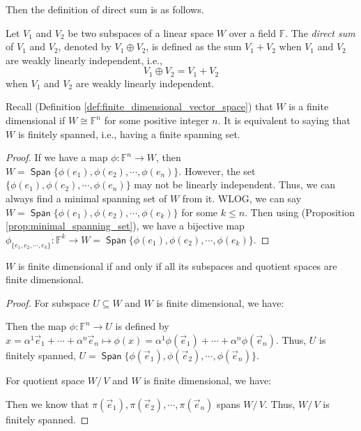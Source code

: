 \documentclass[
	11pt, %
	fleqn, %
	a4paper, %
]{LegrandOrangeBook}
\newcommand{\quotient}[2]{#1/\, #2} %
\newcommand{\F}{\mathbb{F}} %
\DeclareMathOperator{\Span}{\mathsf{Span}}
\begin{document}
Then the definition of direct sum is as follows.
\begin{definition}
    Let $V_1$ and $V_2$ be two subspaces of a linear space $W$ over a field $\F$. The \emph{direct sum} of $V_1$ and $V_2$, denoted by $V_1 \oplus V_2$, is defined as the sum $V_1 + V_2$ when $V_1$ and $V_2$ are weakly linearly independent, i.e.,
    \[
        V_1 \oplus V_2 = V_1 + V_2
    \]
    when $V_1$ and $V_2$ are weakly linearly independent.    
\end{definition}

Recall (Definition \ref{def:finite_dimensional_vector_space}) that $W$ is a finite dimensional if $W \cong \F^n$ for some positive integer $n$. It is equivalent to saying that $W$ is finitely spanned, i.e., having a finite spanning set.

\begin{proof}
    If we have a map $\phi : \F^n \to W$, then $W = \Span\{\phi(e_1), \phi(e_2), \cdots, \phi(e_n)\}$. However, the set $\{\phi(e_1), \phi(e_2), \cdots, \phi(e_n)\}$ may not be linearly independent. Thus, we can always find a minimal spanning set of $W$ from it. WLOG, we can say $W = \Span\{\phi(e_1), \phi(e_2), \cdots, \phi(e_k)\}$ for some $k \leq n$. Then using (Proposition \ref{prop:minimal_spanning_set}), we have a bijective map $\phi_{\{e_1, e_2, \cdots, e_k\}} : \F^k \to W = \Span\{\phi(e_1), \phi(e_2), \cdots, \phi(e_k)\}$.
\end{proof}

\begin{proposition} \label{prop:finite_dimensional_subspace_quotient_space}
    $W$ is finite dimensional if and only if all its subspaces and quotient spaces are finite dimensional.
\end{proposition}

\begin{proof}
    For subspace $U \subseteq W$ and $W$ is finite dimensional, we have:
    \begin{center}
    \end{center}
    Then the map $\phi : \F^n \to U$ is defined by $x = \alpha^1 \vec{e}_1 + \cdots + \alpha^n \vec{e}_n \mapsto \phi(x) = \alpha^1 \phi(\vec{e}_1) + \cdots + \alpha^n \phi(\vec{e}_n)$. Thus, $U$ is finitely spanned, $U = \Span\{\phi(\vec{e}_1), \phi(\vec{e}_2), \cdots, \phi(\vec{e}_n)\}$. 

    For quotient space $\quotient{W}{V}$ and $W$ is finite dimensional, we have:
    \begin{center}
    \end{center}
    Then we know that $\pi(\vec{e}_1), \pi(\vec{e}_2), \cdots, \pi(\vec{e}_n)$ spans $\quotient{W}{V}$. Thus, $\quotient{W}{V}$ is finitely spanned.
\end{proof}
\end{document}
